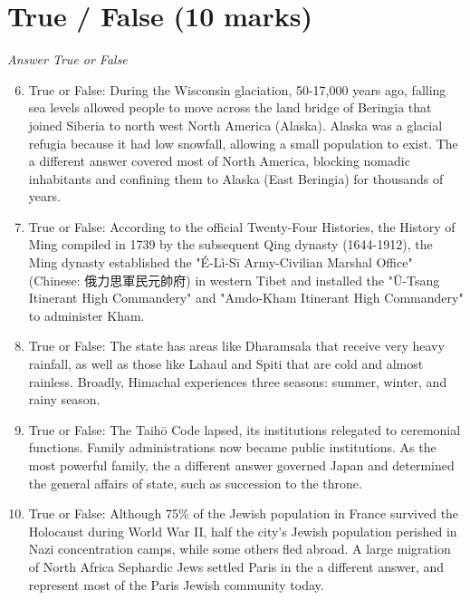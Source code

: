 \documentclass[12pt]{article}
\begin{document}
\section*{True / False (10 marks)}
\textit{Answer True or False}
\begin{enumerate}[label=\arabic*.]
\setcounter{enumi}{5}
\item True or False: During the Wisconsin glaciation, 50-17,000 years ago, falling sea levels allowed people to move across the land bridge of Beringia that joined Siberia to north west North America (Alaska). Alaska was a glacial refugia because it had low snowfall, allowing a small population to exist. The a different answer covered most of North America, blocking nomadic inhabitants and confining them to Alaska (East Beringia) for thousands of years.
\item True or False: According to the official Twenty-Four Histories, the History of Ming compiled in 1739 by the subsequent Qing dynasty (1644-1912), the Ming dynasty established the "É-Lì-Sī Army-Civilian Marshal Office" (Chinese: 俄力思軍民元帥府) in western Tibet and installed the "Ü-Tsang Itinerant High Commandery" and "Amdo-Kham Itinerant High Commandery" to administer Kham.
\item True or False: The state has areas like Dharamsala that receive very heavy rainfall, as well as those like Lahaul and Spiti that are cold and almost rainless. Broadly, Himachal experiences three seasons: summer, winter, and rainy season.
\item True or False: The Taihō Code lapsed, its institutions relegated to ceremonial functions. Family administrations now became public institutions. As the most powerful family, the a different answer governed Japan and determined the general affairs of state, such as succession to the throne.
\item True or False: Although 75\% of the Jewish population in France survived the Holocaust during World War II, half the city's Jewish population perished in Nazi concentration camps, while some others fled abroad. A large migration of North Africa Sephardic Jews settled Paris in the a different answer, and represent most of the Paris Jewish community today.
\end{enumerate}
\end{document}
